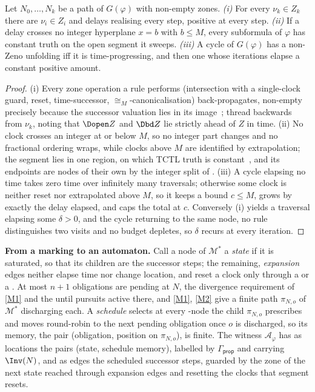 \begin{lemma}\label{lem:zones}
Let $N_0,\dots,N_k$ be a path of $G(\varphi)$ with non-empty zones. \emph{(i)} For every $\nu_k\in
Z_k$ there are $\nu_i\in Z_i$ and delays realising every step, positive at every 
step. \emph{(ii)} If a delay crosses no integer hyperplane $x=b$ with $b\le M$, every subformula of
$\varphi$ has constant truth on the open segment it sweeps. \emph{(iii)} A cycle of $G(\varphi)$ has
a non-Zeno unfolding iff it is time-progressing, and then one whose iterations elapse a constant
positive amount.
\end{lemma}
\begin{proof}
(i) Every zone operation a rule performs (intersection with a single-clock guard, reset,
time-successor, $\cong_M$-canonicalisation) back-propagates, non-empty precisely because the
successor valuation lies in its image~\cite{Bouyer05TimedAutomata}; thread backwards from $\nu_k$,
noting that $\Dopen Z$ and $\Dbd Z$ lie strictly ahead of $Z$ in time. (ii) No clock crosses an
integer at or below $M$, so no integer part changes and no fractional ordering wraps, while clocks
above $M$ are identified by extrapolation; the segment lies in one region, on which TCTL truth is
constant~\cite{AlurCourcoubetisDill1990,Bouyer05TimedAutomata}, and its endpoints are nodes of their
own by the integer split of . (iii) A cycle elapsing no time takes zero time over
infinitely many traversals; otherwise some clock is neither reset nor extrapolated above $M$, so it
keeps a bound $c\le M$, grows by exactly the delay elapsed, and caps the total at $c$. Conversely (i)
yields a traversal elapsing some $\delta>0$, and the cycle returning to the same node, no rule
distinguishes two visits and no budget depletes, so $\delta$ recurs at every iteration.
\end{proof}

\noindent
\textbf{From a marking to an automaton.} Call a node of $\mathcal M^{*}$ a \emph{state} if it is
saturated, so that its children are the successor steps; the remaining, \emph{expansion} edges
neither elapse time nor change location, and reset a clock only through a  or a
. At most $n+1$ obligations are pending at $N$, the divergence requirement of
\ref{M1} and the until pursuits active there, and \ref{M1}, \ref{M2} give a finite path $\pi_{N,o}$
of $\mathcal M^{*}$ discharging each. A \emph{schedule} selects at every \ORn-node the child
$\pi_{N,o}$ prescribes and moves round-robin to the next pending obligation once $o$ is discharged,
so its memory, the pair (obligation, position on $\pi_{N,o}$), is finite. The witness
$\mathcal A_\varphi$ has as locations the pairs (state, schedule memory), labelled by
$\Gamma_{\mathsf{prop}}$ and carrying $\Inv(N)$, and as edges the scheduled successor steps, guarded
by the zone of the next state reached through expansion edges and resetting the clocks that segment
resets.

